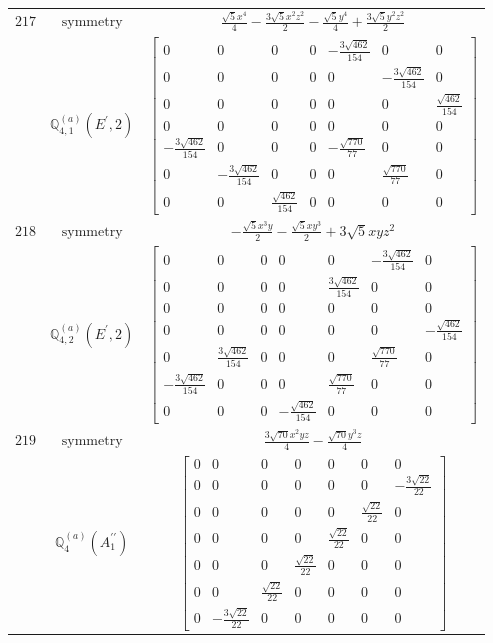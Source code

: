 \documentclass[fleqn,8pt,landscape]{jsarticle}
\begin{document}
\begin{longtable}{ccc}
$ 217 $ & $ \text{symmetry} $ & $ \frac{\sqrt{5} x^{4}}{4} - \frac{3 \sqrt{5} x^{2} z^{2}}{2} - \frac{\sqrt{5} y^{4}}{4} + \frac{3 \sqrt{5} y^{2} z^{2}}{2} $ \\
$  $ & $ \mathbb{Q}_{4,1}^{(a)}(E^{\prime},2) $ & $ \begin{bmatrix} 0 & 0 & 0 & 0 & - \frac{3 \sqrt{462}}{154} & 0 & 0 \\ 0 & 0 & 0 & 0 & 0 & - \frac{3 \sqrt{462}}{154} & 0 \\ 0 & 0 & 0 & 0 & 0 & 0 & \frac{\sqrt{462}}{154} \\ 0 & 0 & 0 & 0 & 0 & 0 & 0 \\ - \frac{3 \sqrt{462}}{154} & 0 & 0 & 0 & - \frac{\sqrt{770}}{77} & 0 & 0 \\ 0 & - \frac{3 \sqrt{462}}{154} & 0 & 0 & 0 & \frac{\sqrt{770}}{77} & 0 \\ 0 & 0 & \frac{\sqrt{462}}{154} & 0 & 0 & 0 & 0 \end{bmatrix} $ \\ \hline
$ 218 $ & $ \text{symmetry} $ & $ - \frac{\sqrt{5} x^{3} y}{2} - \frac{\sqrt{5} x y^{3}}{2} + 3 \sqrt{5} x y z^{2} $ \\
$  $ & $ \mathbb{Q}_{4,2}^{(a)}(E^{\prime},2) $ & $ \begin{bmatrix} 0 & 0 & 0 & 0 & 0 & - \frac{3 \sqrt{462}}{154} & 0 \\ 0 & 0 & 0 & 0 & \frac{3 \sqrt{462}}{154} & 0 & 0 \\ 0 & 0 & 0 & 0 & 0 & 0 & 0 \\ 0 & 0 & 0 & 0 & 0 & 0 & - \frac{\sqrt{462}}{154} \\ 0 & \frac{3 \sqrt{462}}{154} & 0 & 0 & 0 & \frac{\sqrt{770}}{77} & 0 \\ - \frac{3 \sqrt{462}}{154} & 0 & 0 & 0 & \frac{\sqrt{770}}{77} & 0 & 0 \\ 0 & 0 & 0 & - \frac{\sqrt{462}}{154} & 0 & 0 & 0 \end{bmatrix} $ \\ \hline
$ 219 $ & $ \text{symmetry} $ & $ \frac{3 \sqrt{70} x^{2} y z}{4} - \frac{\sqrt{70} y^{3} z}{4} $ \\
$  $ & $ \mathbb{Q}_{4}^{(a)}(A_{1}^{\prime\prime}) $ & $ \begin{bmatrix} 0 & 0 & 0 & 0 & 0 & 0 & 0 \\ 0 & 0 & 0 & 0 & 0 & 0 & - \frac{3 \sqrt{22}}{22} \\ 0 & 0 & 0 & 0 & 0 & \frac{\sqrt{22}}{22} & 0 \\ 0 & 0 & 0 & 0 & \frac{\sqrt{22}}{22} & 0 & 0 \\ 0 & 0 & 0 & \frac{\sqrt{22}}{22} & 0 & 0 & 0 \\ 0 & 0 & \frac{\sqrt{22}}{22} & 0 & 0 & 0 & 0 \\ 0 & - \frac{3 \sqrt{22}}{22} & 0 & 0 & 0 & 0 & 0 \end{bmatrix} $ \\ \hline

\end{longtable}
\end{document}
